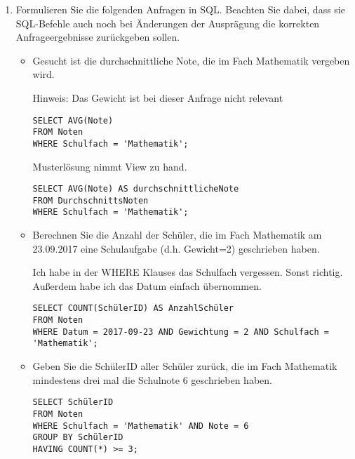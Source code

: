 \documentclass{lehramt-informatik-aufgabe}
\begin{document}
\begin{enumerate}
\item Formulieren Sie die folgenden Anfragen in SQL. Beachten Sie dabei,
dass sie SQL-Befehle auch noch bei Änderungen der Ausprägung die
korrekten Anfrageergebnisse zurückgeben sollen.

\begin{itemize}

%

\item Gesucht ist die durchschnittliche Note, die im Fach Mathematik
vergeben wird.

Hinweis: Das Gewicht ist bei dieser Anfrage nicht relevant

\begin{antwort}
\begin{verbatim}
SELECT AVG(Note)
FROM Noten
WHERE Schulfach = 'Mathematik';
\end{verbatim}
\end{antwort}

Musterlösung nimmt View zu hand.

\begin{antwort}
\begin{verbatim}
SELECT AVG(Note) AS durchschnittlicheNote
FROM DurchschnittsNoten
WHERE Schulfach = 'Mathematik';
\end{verbatim}
\end{antwort}

%

\item Berechnen Sie die Anzahl der Schüler, die im Fach Mathematik am
23.09.2017 eine Schulaufgabe (d.h. Gewicht=2) geschrieben haben.

\begin{antwort}
Ich habe in der WHERE Klauses das Schulfach vergessen. Sonst richtig.
Außerdem habe ich das Datum einfach übernommen.
\begin{verbatim}
SELECT COUNT(SchülerID) AS AnzahlSchüler
FROM Noten
WHERE Datum = 2017-09-23 AND Gewichtung = 2 AND Schulfach = 'Mathematik';
\end{verbatim}
\end{antwort}

%

\item Geben Sie die SchülerID aller Schüler zurück, die im Fach
Mathematik mindestens drei mal die Schulnote 6 geschrieben haben.

\begin{antwort}
\begin{verbatim}
SELECT SchülerID
FROM Noten
WHERE Schulfach = 'Mathematik' AND Note = 6
GROUP BY SchülerID
HAVING COUNT(*) >= 3;
\end{verbatim}
\end{antwort}


\end{itemize}
\end{enumerate}
\end{document}

